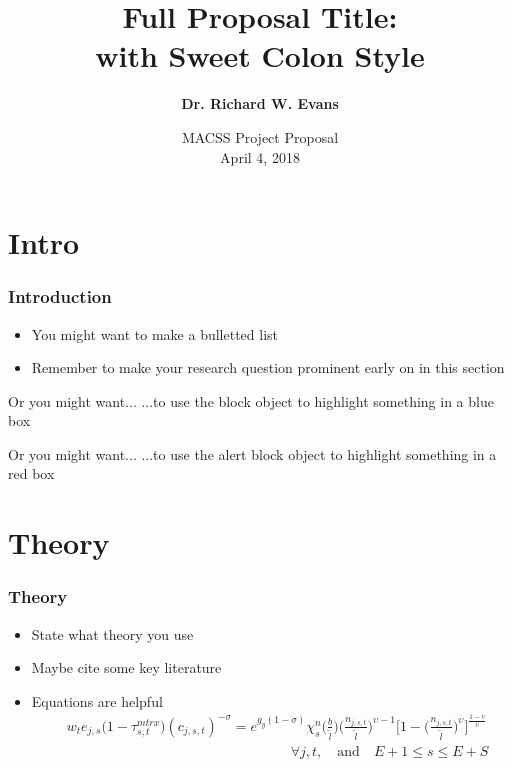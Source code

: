 \documentclass{beamer}
\title[Short Proposal Title]{\textbf{Full Proposal Title: \\ with Sweet Colon Style}}
\author[Evans]{\textbf{Dr. Richard W. Evans}}
\date[Short Occasion]{MACSS Project Proposal \\ April 4, 2018}
\begin{document}
\begin{frame}
  \titlepage
\end{frame}


\section{Intro}

  \begin{frame}
    \frametitle{Introduction}
    \begin{itemize}
      \item You might want to make a bulletted list
      \vspace{3mm}
      \item Remember to make your research question prominent early on in this section
    \end{itemize}
    \vspace{5mm}
    \begin{block}{Or you might want...}
      ...to use the block object to highlight something in a blue box
    \end{block}
    \vspace{5mm}
    \begin{alertblock}{Or you might want...}
      ...to use the alert block object to highlight something in a red box
    \end{alertblock}
  \end{frame}


\section{Theory}

  \begin{frame}
    \frametitle{Theory}
    \begin{itemize}
      \item State what theory you use
      \vspace{2mm}
      \item Maybe cite some key literature
      \vspace{2mm}
      \item Equations are helpful
      \footnotesize{\begin{equation*}
        \begin{split}
          &w_t e_{j,s}\bigl(1 - \tau^{mtrx}_{s,t}\bigr)(c_{j,s,t})^{-\sigma} = e^{g_y(1-\sigma)}\chi^n_{s}\biggl(\frac{b}{\tilde{l}}\biggr)\biggl(\frac{n_{j,s,t}}{\tilde{l}}\biggr)^{\upsilon-1}\Biggl[1 - \biggl(\frac{n_{j,s,t}}{\tilde{l}}\biggr)^\upsilon\Biggr]^{\frac{1-\upsilon}{\upsilon}} \\
          &\qquad\qquad\qquad\qquad\qquad\qquad\qquad\qquad\forall j,t, \quad\text{and}\quad E+1\leq s\leq E+S \\
        \end{split}
      \end{equation*}}
    \end{itemize}
  \end{frame}
\end{document}
